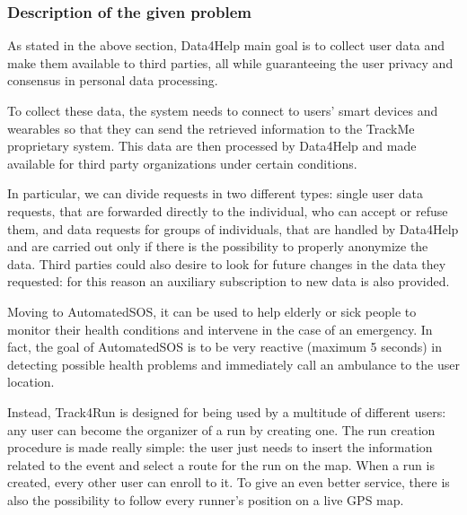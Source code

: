 \subsubsection{Description of the given problem}

As stated in the above section, Data4Help main goal is to collect user data and make them available to third parties, all while guaranteeing the user privacy and consensus in personal data processing. 

To collect these data, the system needs to connect to users' smart devices and wearables so that they can send the retrieved information to the TrackMe proprietary system. This data are then processed by Data4Help and made available for third party organizations under certain conditions.

In particular, we can divide requests in two different types: single user data requests, that are forwarded directly to the individual, who can accept or refuse them, and data requests for groups of individuals, that are handled by Data4Help and are carried out only if there is the possibility to properly anonymize the data. Third parties could also desire to look for future changes in the data they requested: for this reason an auxiliary subscription to new data is also provided.

Moving to AutomatedSOS, it can be used to help elderly or sick people to monitor their health conditions and intervene in the case of an emergency. In fact, the goal of AutomatedSOS is to be very reactive (maximum 5 seconds) in detecting possible health problems and immediately call an ambulance to the user location.

Instead, Track4Run is designed for being used by a multitude of different users: any user can become the organizer of a run by creating one. The run creation procedure is made really simple: the user just needs to insert the information related to the event and select a route for the run on the map. When a run is created, every other user can enroll to it. To give an even better service, there is also the possibility to follow every runner's position on a live GPS map.

